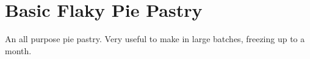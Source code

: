 \section{
    Basic Flaky Pie Pastry
}\label{basicFlakyPiePastry}

\begin{recipestats}[
        servings=1 pastry,
        preptime=45 \minute,
        inactivetime=1 \hour,
        source=\citefield{pie2004}{title}~\cite{pie2004},
    ]
\end{recipestats}

\begin{recipeabstract}
    An all purpose pie pastry.
    Very useful to make in large batches, freezing up to a month.
\end{recipeabstract}

\begin{ingredientcolumns}
    \begin{ingredientblock}
        \\
        \\
    \end{ingredientblock}
    \begin{ingredientblock}
        \\
        \\
    \end{ingredientblock}
\end{ingredientcolumns}


